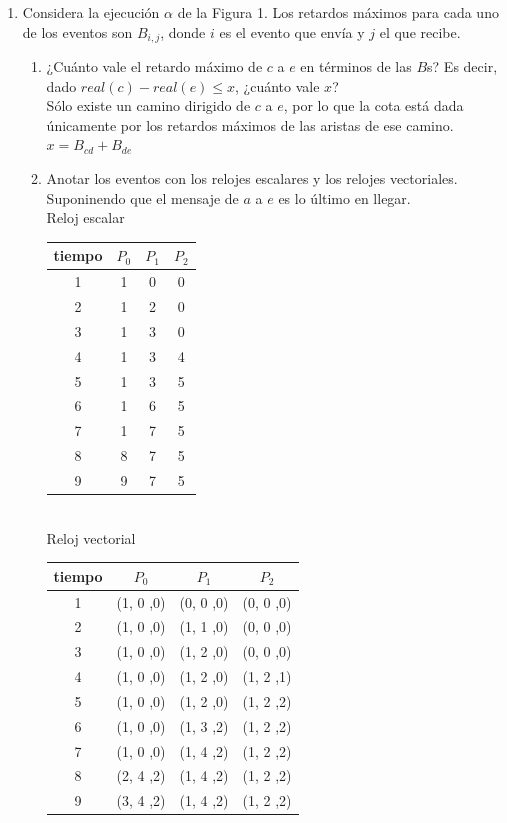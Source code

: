 \documentclass[12pt,a4paper]{report}
\begin{document}
	\begin{enumerate}
		\item {
			Considera la ejecución $\alpha$ de la Figura 1. Los retardos máximos
			para cada uno de los eventos son $B_{i, j}$, donde $i$ es el evento
			que envía y $j$ el que recibe.
			\begin{enumerate}
				\item {
					¿Cuánto vale el retardo máximo de $c$ a $e$ en términos de
					las $B$s? Es decir, dado $real(c)-real(e) \leq x$, ¿cuánto
					vale $x$?\\
					Sólo existe un camino dirigido de $c$ a $e$, por lo que la
					cota está dada únicamente por los retardos máximos de las
					aristas de ese camino.
					$x = B_{cd} + B_{de}$
				}

				\item {
					Anotar los eventos con los relojes escalares y los relojes
					vectoriales.\\
					Suponinendo que el mensaje de $a$ a $e$ es lo último en
					llegar.\\
					Reloj escalar\\
					\begin{tabular}{| c | c | c | c |}
						\hline
  						tiempo & $P_0$ & $P_1$ & $P_2$ \\ \hline
  						 1 & 1 & 0 & 0\\ \hline
  						 2 & 1 & 2 & 0\\ \hline
						 3 & 1 & 3 & 0\\ \hline
						 4 & 1 & 3 & 4\\ \hline
						 5 & 1 & 3 & 5\\ \hline
						 6 & 1 & 6 & 5\\ \hline
						 7 & 1 & 7 & 5\\ \hline
						 8 & 8 & 7 & 5\\ \hline
						 9 & 9 & 7 & 5\\ \hline

						\hline
					\end{tabular}\\
					Reloj vectorial\\
					\begin{tabular}{| c | c | c | c |}
						\hline
  						tiempo & $P_0$ & $P_1$ & $P_2$ \\ \hline
  						 1 & (1, 0 ,0) & (0, 0 ,0) & (0, 0 ,0)\\ \hline
  						 2 & (1, 0 ,0) & (1, 1 ,0) & (0, 0 ,0)\\ \hline
						 3 & (1, 0 ,0) & (1, 2 ,0) & (0, 0 ,0)\\ \hline
						 4 & (1, 0 ,0) & (1, 2 ,0) & (1, 2 ,1)\\ \hline
						 5 & (1, 0 ,0) & (1, 2 ,0) & (1, 2 ,2)\\ \hline
						 6 & (1, 0 ,0) & (1, 3 ,2) & (1, 2 ,2)\\ \hline
						 7 & (1, 0 ,0) & (1, 4 ,2) & (1, 2 ,2)\\ \hline
						 8 & (2, 4 ,2) & (1, 4 ,2) & (1, 2 ,2)\\ \hline
						 9 & (3, 4 ,2) & (1, 4 ,2) & (1, 2 ,2)\\ \hline


\end{tabular}}
\end{enumerate}}
\end{enumerate}
\end{document}
